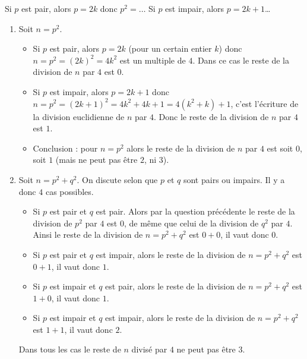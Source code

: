 \documentclass[11pt,class=report,crop=false]{standalone}
\begin{document}
\finenonce 

\indication
Si $p$ est pair, alors $p=2k$ donc $p^2 = \ldots${}
Si $p$ est impair, alors $p=2k+1$\ldots
\finindication

\correction
\sauteligne
\begin{enumerate}
    \item Soit $n=p^2$. 
    \begin{itemize}
      \item Si $p$ est pair, alors $p=2k$ (pour un certain entier $k$) donc $n=p^2 = (2k)^2 = 4k^2$ est un multiple de $4$. Dans ce cas le reste de la division de $n$ par $4$ est $0$.
    
      \item Si $p$ est impair, alors $p=2k+1$ donc $n=p^2 = (2k+1)^2 = 4k^2+4k+1 = 4(k^2+k) + 1$, c'est l'écriture de la division euclidienne de $n$ par $4$. Donc le reste de la division de $n$ par $4$ est $1$.
    
      \item Conclusion : pour $n=p^2$ alors le reste de la division de $n$ par $4$ est soit $0$, soit $1$ (mais ne peut pas être $2$, ni $3$).
    \end{itemize}
    
    \item Soit $n=p^2+q^2$.
    On discute selon que $p$ et $q$ sont pairs ou impairs. Il y a donc $4$ cas possibles.
    \begin{itemize}
         \item Si $p$ est pair et $q$ est pair. Alors par la question précédente le reste de la division de $p^2$ par $4$ est $0$, de même que celui de la division de $q^2$ par $4$. Ainsi le reste de la division de $n=p^2+q^2$ est $0+0$, il vaut donc $0$.
         
         \item Si $p$ est pair et $q$ est impair, alors le reste de la division de $n=p^2+q^2$ est $0+1$, il vaut donc $1$.
           
         \item Si $p$ est impair et $q$ est pair, alors le reste de la division de $n=p^2+q^2$ est $1+0$, il vaut donc $1$.       
         
         \item Si $p$ est impair et $q$ est impair, alors le reste de la division de $n=p^2+q^2$ est $1+1$, il vaut donc $2$.  
   \end{itemize}   

    Dans tous les cas le reste de $n$ divisé par $4$ ne peut pas être $3$.
    
\end{enumerate}
\fincorrection
\finexercice
\end{document}
